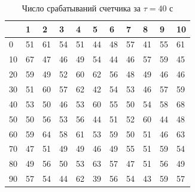 \documentclass[a4paper]{article}
\begin{document}
\begin{table}[!h]
\begin{center}
\begin{tabular}{|l|l|l|l|l|l|l|l|l|l|l|}
\hline
   & 1  & 2  & 3  & 4  & 5  & 6  & 7  & 8  & 9  & 10 \\ \hline
0  & 51 & 61 & 54 & 51 & 44 & 48 & 57 & 41 & 55 & 61 \\ \hline
10 & 67 & 47 & 46 & 49 & 54 & 44 & 46 & 57 & 59 & 45 \\ \hline
20 & 59 & 49 & 52 & 60 & 62 & 56 & 48 & 49 & 46 & 46 \\ \hline
30 & 51 & 60 & 57 & 62 & 42 & 54 & 53 & 46 & 57 & 59 \\ \hline
40 & 53 & 50 & 46 & 53 & 60 & 55 & 50 & 54 & 58 & 68 \\ \hline
50 & 50 & 56 & 53 & 56 & 44 & 51 & 52 & 60 & 44 & 48 \\ \hline
60 & 59 & 64 & 58 & 61 & 53 & 59 & 50 & 51 & 46 & 63 \\ \hline
70 & 47 & 51 & 49 & 49 & 46 & 49 & 55 & 51 & 59 & 54 \\ \hline
80 & 49 & 56 & 50 & 53 & 63 & 57 & 47 & 51 & 56 & 49 \\ \hline
90 & 57 & 54 & 44 & 62 & 39 & 56 & 54 & 43 & 59 & 57 \\ \hline
\end{tabular}
\caption{Число срабатываний счетчика за $\tau = 40$ с}
\end{center}
\end{table}
\end{document}
